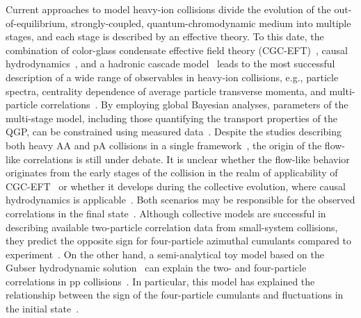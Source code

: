 Current approaches to model heavy-ion collisions divide the evolution of the out-of-equilibrium, strongly-coupled, quantum-chromodynamic medium into multiple stages, and each stage is described by an effective theory. To this date, the combination of color-glass condensate effective field theory (CGC-EFT)~\cite{Schenke:2012wb,Schenke:2012hg}, causal hydrodynamics~\cite{Kolb:2003dz,Song:2007ux,Dusling:2007gi,Holopainen:2010gz,Schenke:2010rr,Romatschke:2007mq,Niemi:2015qia,Jeon:2015dfa,Romatschke:2017ejr}, and a hadronic cascade model~\cite{Bass:1998ca,Bleicher:1999xi,Weil:2016zrk} leads to the most successful description of a wide range of observables in heavy-ion collisions, e.g., particle spectra, centrality dependence of average particle transverse momenta, and multi-particle correlations~\cite{ALICE:2016kpq,Acharya:2017gsw,Acharya:2017zfg,Acharya:2020taj,ALICE:2021klf,ALICE:2021adw,ALICE:2013mez,ALICE:2011ab}. 
By employing global Bayesian analyses, parameters of the multi-stage model, including those quantifying the transport properties of the QGP, can be constrained using measured data~\cite{Bernhard:2016tnd,Bernhard:2019bmu,Parkkila:2021tqq,Parkkila:2021yha}.
Despite the studies describing both heavy AA and pA collisions in a single framework~\cite{Moreland:2018gsh}, the origin of the flow-like correlations is still under debate. It is unclear whether the flow-like behavior originates from the early stages of the collision in the realm of applicability of CGC-EFT~\cite{Dusling:2012cg,Bzdak:2013zma} or whether it develops during the collective evolution, where causal hydrodynamics is applicable~\cite{Greif:2017bnr,Mantysaari:2017cni}. Both scenarios may be responsible for the observed correlations in the final state~\cite{Greif:2017bnr}. Although collective models are successful in describing available two-particle correlation data from small-system collisions, they predict the opposite sign for four-particle azimuthal cumulants compared to experiment~\cite{Khachatryan:2016txc,ATLAS:2017rtr,Zhao:2017rgg}. On the other hand, a semi-analytical toy model based on the Gubser hydrodynamic solution~\cite{Gubser:2010ze,Gubser:2010ui} can explain the two- and four-particle correlations in pp collisions~\cite{Taghavi:2019mqz}. In particular, this model has explained the relationship between the sign of the four-particle cumulants and fluctuations in the initial state~\cite{Taghavi:2019mqz}. 

